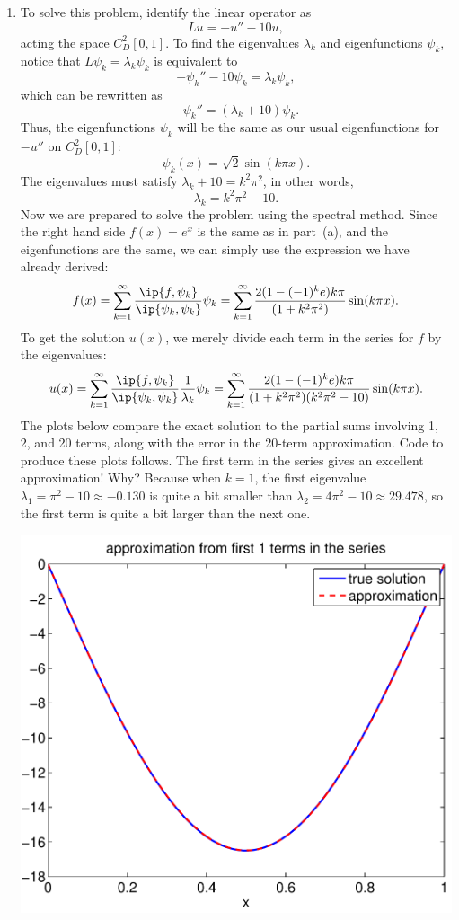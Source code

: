{\begin{solution}
\begin{enumerate}
\item To solve this problem, identify the linear operator as
\[ L u = -u'' - 10 u,\]
acting the space $C^2_D[0,1]$.  To find the eigenvalues $\lambda_k$ and eigenfunctions $\psi_k$,
notice that $L \psi_k = \lambda_k \psi_k$ is equivalent to
\[ -\psi_k'' - 10 \psi_k = \lambda_k \psi_k,\]
which can be rewritten as
\[ -\psi_k'' = (\lambda_k + 10) \psi_k.\]
Thus, the eigenfunctions $\psi_k$ will be the same as our usual eigenfunctions for $-u''$ on
$C^2_D[0,1]$: 
\[ \psi_k(x) = \sqrt{2} \sin(k \pi x).\]
The eigenvalues must satisfy $\lambda_k + 10 = k^2 \pi^2$, in other words,
\[ \lambda_k = k^2\pi^2 - 10.\]
Now we are prepared to solve the problem using the spectral method.  
Since the right hand side $f(x) = e^x$ is the same as in part~(a), 
and the eigenfunctions are the same, we can simply use the expression
we have already derived:
\[ f(x) = \sum_{k=1}^\infty {\ip{f,\psi_k} \over \ip{\psi_k,\psi_k}} \psi_k
         = \sum_{k=1}^\infty {2(1-(-1)^k e) k \pi \over (1+k^2\pi^2)} \sin(k\pi x).\]
To get the solution $u(x)$, we merely divide each term in the series for $f$ by the eigenvalues:
\[ u(x) = \sum_{k=1}^\infty {\ip{f,\psi_k} \over \ip{\psi_k,\psi_k}} {1\over \lambda_k} \psi_k
         = \sum_{k=1}^\infty {2(1-(-1)^k e) k \pi \over (1+k^2\pi^2)(k^2\pi^2 - 10)} \sin(k\pi x).\]
The plots below compare the exact solution to the partial sums involving
1, 2, and 20 terms, along with the error in the 20-term approximation.  
Code to produce these plots follows.  
The first term in the series gives an excellent approximation!  Why?
Because when $k=1$, the first eigenvalue $\lambda_1 = \pi^2- 10\approx -0.130$ 
is quite a bit smaller than $\lambda_2 = 4\pi^2 - 10 \approx 29.478$, so 
the first term is quite a bit larger than the next one.
\begin{center}
   \includegraphics[scale=0.4]{bvps4_1}\quad

\end{center}
\end{enumerate}
\end{solution}}
